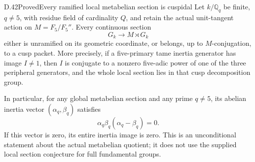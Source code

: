\begin{statement}{D.42}{Proved}{Every ramified local metabelian section is cuspidal}
Let \(k/\mathbb Q_q\) be finite, \(q\ne5\), with residue
field of cardinality \(Q\), and retain the actual unit-tangent
action on \(M=F_5/F_5''\). Every continuous section
\[
             G_k\longrightarrow M\rtimes G_k
\]
either is unramified on its geometric coordinate, or belongs,
up to \(M\)-conjugation, to a cusp packet.
More precisely, if a five-primary tame inertia generator
has image \(I\ne1\), then \(I\) is conjugate to a nonzero
five-adic power of one of the three peripheral generators,
and the whole local section lies in that cusp decomposition
group.

In particular, for any global metabelian section and any
prime \(q\ne5\), its abelian inertia vector \((\alpha_q,\beta_q)\)
satisfies
\[
       \alpha_q\beta_q(\alpha_q-\beta_q)=0.                \tag{D.42.1}
\]
If this vector is zero, its entire inertia image is zero.
This is an unconditional statement about the actual
metabelian quotient; it does not use the supplied local
section conjecture for full fundamental groups.
\end{statement}
